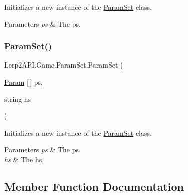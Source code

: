 Initializes a new instance of the \hyperlink{class_lerp2_a_p_i_1_1_game_1_1_param_set}{Param\+Set} class. 


\begin{DoxyParams}{Parameters}
{\em ps} & The ps.\\
\hline
\end{DoxyParams}
\mbox{\label{class_lerp2_a_p_i_1_1_game_1_1_param_set_aee43b9e55e5c5382eabe60fa445e23ba}} 
\subsubsection{\texorpdfstring{Param\+Set()}{ParamSet()}\hspace{0.1cm}{\footnotesize\ttfamily [2/2]}}
{\footnotesize\ttfamily Lerp2\+A\+P\+I.\+Game.\+Param\+Set.\+Param\+Set (\begin{DoxyParamCaption}\item[{\hyperlink{class_lerp2_a_p_i_1_1_game_1_1_param}{Param} \mbox{[}$\,$\mbox{]}}]{ps,  }\item[{string}]{hs }\end{DoxyParamCaption})\hspace{0.3cm}{\ttfamily [inline]}}



Initializes a new instance of the \hyperlink{class_lerp2_a_p_i_1_1_game_1_1_param_set}{Param\+Set} class. 


\begin{DoxyParams}{Parameters}
{\em ps} & The ps.\\
\hline
{\em hs} & The hs.\\
\hline
\end{DoxyParams}


\subsection{Member Function Documentation}
\mbox{\label{class_lerp2_a_p_i_1_1_game_1_1_param_set_a0d3effe2f519c6f7e15a9e3ffe102518}} 
